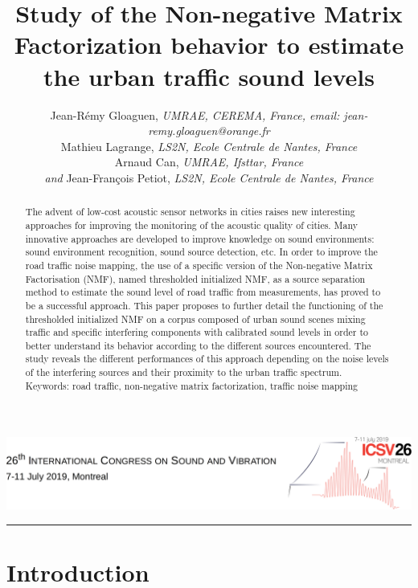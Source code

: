 \documentclass[12pt,english,twoside]{article}
\title{Study of the Non-negative Matrix Factorization behavior to estimate the urban traffic sound levels}
\author{
Jean-R\'emy Gloaguen, {\small \textit{UMRAE, CEREMA, France, email: jean-remy.gloaguen@orange.fr}}
\medskip
\\
Mathieu Lagrange, {\small \textit{LS2N, Ecole Centrale de Nantes, France}}
\medskip
\\
Arnaud Can, {\small \textit{UMRAE, Ifsttar, France}}
\medskip
\\
\emph{and} Jean-Fran\c cois Petiot, 
{\small \textit{LS2N, Ecole Centrale de Nantes, France}}}
\makeatletter
\def\maketitle{ 
  \thispagestyle{firstpage} 
\noindent\includegraphics[width=\textwidth]{ICSV26-header.png}\\
  {
   \fontsize{17}{20}\selectfont\sffamily{}  \noindent \MakeUppercase{\textbf{\@title}}
  
   \bigskip
   \fontsize{14}{20}\selectfont\rmfamily{} \noindent \@author
  } 
}
\makeatother
\begin{document}
\maketitle

\renewcommand{\abstractname}{\vspace{-\baselineskip}} %

\begin{abstract}	\noindent
The advent of low-cost acoustic sensor networks in cities raises new interesting approaches for improving the monitoring of the acoustic quality of cities. Many innovative approaches are developed to improve knowledge on sound environments: sound environment recognition, sound source detection, etc. In order to improve the road traffic noise mapping, the use of a specific version of the Non-negative Matrix Factorisation (NMF), named thresholded initialized NMF, as a source separation method to estimate the sound level of road traffic from measurements, has proved to be a successful approach.
This paper proposes to further detail the functioning of the thresholded initialized NMF on a corpus composed of urban sound scenes mixing traffic and specific interfering components with calibrated sound levels in order to better understand its behavior according to the different sources encountered.
The study reveals the different performances of this approach depending on the noise levels of the interfering sources and their proximity to the urban traffic spectrum.\\

\noindent Keywords: road traffic, non-negative matrix factorization, traffic noise mapping
\end{abstract}

\quad\rule{425pt}{0.4pt}


\section{Introduction} 
\end{document}
